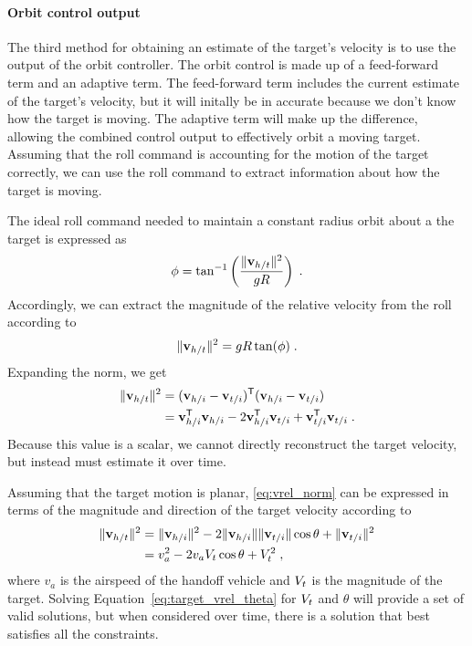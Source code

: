 \paragraph{Orbit control output}
The third method for obtaining an estimate of the target's velocity is to use the output of the orbit controller. The orbit control is made up of a feed-forward term and an adaptive term. The feed-forward term includes the current estimate of the target's velocity, but it will initally be in accurate because we don't know how the target is moving. The adaptive term will make up the difference, allowing the combined control output to effectively orbit a moving target. Assuming that the roll command is accounting for the motion of the target correctly, we can use the roll command to extract information about how the target is moving.

The ideal roll command needed to maintain a constant radius orbit about a the target is expressed as
\begin{equation}
    \phi = \tan^{-1}\left(\frac{\lVert{\mathbf{v}}_{h/t}\rVert^2}{gR}\right)\;.
\end{equation}
Accordingly, we can extract the magnitude of the relative velocity from the roll according to
\begin{equation} \label{eq:vrel_phi}
    \lVert{\mathbf{v}}_{h/t}\rVert^2 = gR\tan(\phi)\;.
\end{equation}
Expanding the norm, we get
\begin{align} \label{eq:vrel_norm}
  \lVert{\mathbf{v}}_{h/t}\rVert^2 &= ({\mathbf{v}}_{h/i} - {\mathbf{v}}_{t/i})^{\mathsf{T}} ({\mathbf{v}}_{h/i} - {\mathbf{v}}_{t/i}) \\
     &= {\mathbf{v}}_{h/i}^{\mathsf{T}}{\mathbf{v}}_{h/i}
        - 2{\mathbf{v}}_{h/i}^{\mathsf{T}}{\mathbf{v}}_{t/i}
        + {\mathbf{v}}_{t/i}^{\mathsf{T}}{\mathbf{v}}_{t/i} \;.
\end{align}
Because this value is a scalar, we cannot directly reconstruct the target velocity, but instead must estimate it over time.

Assuming that the target motion is planar, \eqref{eq:vrel_norm} can be expressed in terms of the magnitude and direction of the
target velocity according to
\begin{align} \label{eq:target_vrel_theta}
    \lVert{\mathbf{v}}_{h/t}\rVert^2 &= \lVert{\mathbf{v}}_{h/i}\rVert^2
       - 2\lVert{\mathbf{v}}_{h/i}\rVert\lVert{\mathbf{v}}_{t/i}\rVert\cos\theta
       +\lVert{\mathbf{v}}_{t/i}\rVert^2 \nonumber\\
       &= v_a^2 - 2v_a V_{t} \cos\theta + V_{t}^2\;,
\end{align}
where $v_a$ is the airspeed of the handoff vehicle and $V_{t}$ is the magnitude of the target.
Solving Equation~\eqref{eq:target_vrel_theta} for $V_{t}$ and $\theta$ will provide a set of valid solutions, but when considered over time, there is a solution that best satisfies all the constraints.

